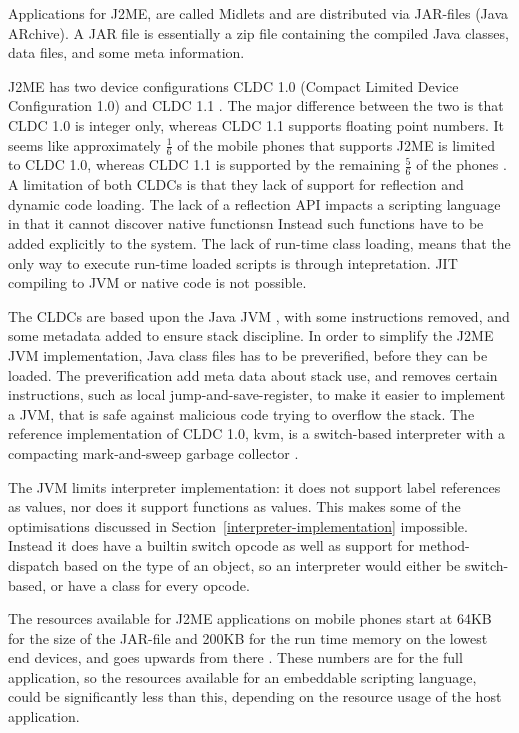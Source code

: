 \documentclass[11pt]{report}
\begin{document}
Applications for J2ME, are called Midlets and are distributed via JAR-files (Java ARchive). A JAR file is essentially a zip file containing the compiled Java classes, data files, and some meta information.

J2ME has two device configurations CLDC 1.0 (Compact Limited Device Configuration 1.0) \cite{cldc10}  and CLDC 1.1  \cite{cldc11}. The major difference between the two is that CLDC 1.0 is integer only, whereas CLDC 1.1 supports floating point numbers.
It seems like approximately $\frac{1}{6}$ of the mobile phones that supports J2ME is limited to CLDC 1.0, whereas CLDC 1.1 is supported by the remaining $\frac{5}{6}$ of the phones \cite{mobref}.
A limitation of both CLDCs is that they lack of support for reflection and dynamic code loading.
The lack of a reflection API impacts a scripting language in that it cannot discover native functionsn Instead such functions have to be added explicitly to the system.
The lack of run-time class loading, means that the only way to execute run-time loaded scripts is through intepretation. JIT compiling to JVM or native code is not possible.

The CLDCs are based upon the Java JVM \cite{jvmref}, with some instructions removed, and some metadata added to ensure stack discipline. 
In order to simplify the J2ME JVM implementation, Java class files has to be preverified, before they can be loaded.
The preverification add meta data about stack use, and removes certain instructions, such as local jump-and-save-register, to make it easier to implement a JVM, that is safe against malicious code trying to overflow the stack.
The reference implementation of CLDC 1.0, kvm, is a switch-based interpreter with a compacting mark-and-sweep garbage collector \cite{kvm}.


The JVM limits interpreter implementation: it does not support label references as values, nor does it support functions as values. This makes some of the optimisations discussed in 
Section~\ref{interpreter-implementation} impossible.
Instead it does have a builtin switch opcode as well as support for method-dispatch based on the type of an object, so an interpreter would either be switch-based, or have a class for every opcode.

The resources available for J2ME applications on mobile phones start at 64KB for the size of the JAR-file and 200KB for the run time memory on the lowest end devices, and goes upwards from there \cite{nokia-optim}.
These numbers are for the full application, so the resources available for an embeddable scripting language, could be significantly less than this, depending on the resource usage of the host application.
\end{document}
